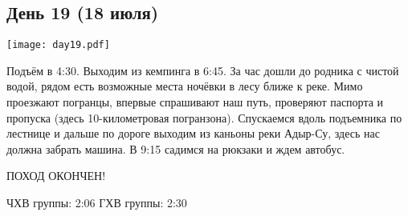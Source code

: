 \graphicspath{{Pictures/Chapter5/Day19}}



\subsection{День 19 (18 июля)}\label{subsec:Day19}
    \parbox[c]{\textwidth}{%
        \texttt{[image: day19.pdf]}\label{fig:Day19_map}%
    }
    \vspace{0.8cm}

Подъём в 4:30. Выходим из кемпинга в 6:45. За час дошли до родника с чистой водой, рядом есть возможные места ночёвки в лесу ближе к реке. Мимо проезжают погранцы, впервые спрашивают наш путь, проверяют паспорта и пропуска (здесь 10-километровая погранзона). Спускаемся вдоль подъемника по лестнице и дальше по дороге выходим из каньоны реки Адыр-Су, здесь нас должна забрать машина. В 9:15 садимся на рюкзаки и ждем автобус.

ПОХОД ОКОНЧЕН!







ЧХВ группы: 2:06
ГХВ группы: 2:30

    \FloatBarrier
